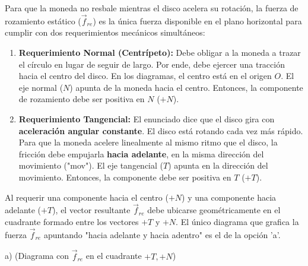 \documentclass[12pt, a4paper]{article}
\begin{document}
Para que la moneda no resbale mientras el disco acelera su rotación, la fuerza de rozamiento estático ($\vec{f}_{re}$) es la única fuerza disponible en el plano horizontal para cumplir con dos requerimientos mecánicos simultáneos:
\begin{enumerate}
    \item \textbf{Requerimiento Normal (Centrípeto):} Debe obligar a la moneda a trazar el círculo en lugar de seguir de largo. Por ende, debe ejercer una tracción hacia el centro del disco. En los diagramas, el centro está en el origen $O$. El eje normal ($N$) apunta de la moneda hacia el centro. Entonces, la componente de rozamiento debe ser positiva en $N$ ($+N$).
    \item \textbf{Requerimiento Tangencial:} El enunciado dice que el disco gira con \textbf{aceleración angular constante}. El disco está rotando cada vez más rápido. Para que la moneda acelere linealmente al mismo ritmo que el disco, la fricción debe empujarla \textbf{hacia adelante}, en la misma dirección del movimiento ("mov"). El eje tangencial ($T$) apunta en la dirección del movimiento. Entonces, la componente debe ser positiva en $T$ ($+T$).
\end{enumerate}

Al requerir una componente hacia el centro ($+N$) y una componente hacia adelante ($+T$), el vector resultante $\vec{f}_{re}$ debe ubicarse geométricamente en el cuadrante formado entre los vectores $+T$ y $+N$.
El único diagrama que grafica la fuerza $\vec{f}_{re}$ apuntando "hacia adelante y hacia adentro" es el de la opción 'a'.

\begin{tcolorbox}[colback=green!5!white, colframe=green!50!black, title=Respuesta Final]
\centering \Large a) (Diagrama con $\vec{f}_{re}$ en el cuadrante $+T, +N$)
\end{tcolorbox}
\end{document}
